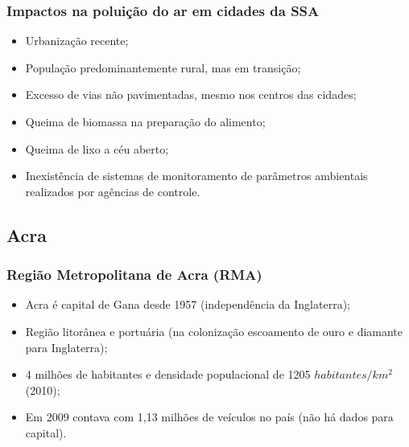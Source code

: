 \begin{frame}
  \frametitle{Impactos na poluição do ar em cidades da SSA}
  \begin{itemize}
    \item Urbanização recente;
    \item População predominantemente rural, mas em transição;
    \item Excesso de vias não pavimentadas, mesmo nos centros das cidades;
    \item Queima de biomassa na preparação do alimento;  
    \item Queima de lixo a céu aberto;
    \item Inexistência de sistemas de monitoramento de parâmetros ambientais realizados por agências de controle.
  \end{itemize}
\end{frame}

\subsection{Acra}
\begin{frame}
	\frametitle{Região Metropolitana de Acra (RMA)}
	  \begin{itemize}
	  	\item Acra é capital de Gana desde 1957 (independência da Inglaterra);
	  	\item Região litorânea e portuária (na colonização escoamento de ouro e diamante para Inglaterra);
	  	\item 4 milhões de habitantes e densidade populacional de 1205 $habitantes/km^2$ (2010);
	  	\item Em 2009 contava com 1,13 milhões de veículos no país (não há dados para capital).   	
	  \end{itemize}
\end{frame}

